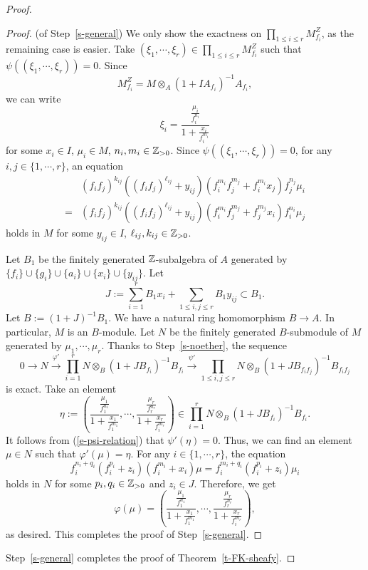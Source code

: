\begin{proof}
\begin{proof}(of Step~\ref{s-general}) 
We only show the exactness on $\prod_{1 \leq i\leq r} M_{f_i}^{Z}$, as the remaining case is easier. 
Take $(\xi_1, \cdots, \xi_r) \in \prod_{1 \leq i\leq r} M_{f_i}^{Z}$ 
such that $\psi((\xi_1, \cdots, \xi_r))=0$. 
Since 
$$M^Z_{f_i}=M \otimes_A (1+IA_{f_i})^{-1}A_{f_i},$$
we can write 
$$\xi_i=\frac{\frac{\mu_i}{f_i^{n_i}}}{1+\frac{x_i}{f_i^{m_i}}}$$
for some $x_i \in I$, $\mu_i \in M$, $n_i, m_i \in \mathbb{Z}_{>0}$. 
Since $\psi((\xi_1, \cdots, \xi_r))=0$, 
for any $i, j \in \{1, \cdots, r\}$, an equation  
\begin{equation}\label{e-psi-relation}
\begin{split}
\,\,\,\,&(f_if_j)^{k_{ij}}((f_if_j)^{\ell_{ij}}+y_{ij})(f_i^{m_i}f_j^{m_j}+f_i^{m_i}x_j)f_j^{n_j}\mu_i \\
=&(f_if_j)^{k_{ij}}((f_if_j)^{\ell_{ij}}+y_{ij})(f_i^{m_i}f_j^{m_j}+f_j^{m_j}x_i)f_i^{n_i}\mu_j
\end{split}
\end{equation}
holds in $M$ for some $y_{ij} \in I$, $\ell_{ij}, k_{ij} \in \mathbb{Z}_{>0}$. 



Let $B_1$ be the finitely generated $\mathbb{Z}$-subalgebra of $A$ generated by $\{f_i\} \cup \{g_i\} \cup \{a_i\} \cup \{x_i\} \cup \{y_{ij}\}$. 
Let 
$$J:=\sum_{i=1}^r B_1x_i+\sum_{1 \leq i, j \leq r} B_1y_{ij} \subset B_1.$$
Let $B:=(1+J)^{-1}B_1$. 
We have a natural ring homomorphism $B \to A$. 
In particular, $M$ is an $B$-module. 
Let $N$ be the finitely generated $B$-submodule of $M$ generated by $\mu_1, \cdots, \mu_r$. 
Thanks to Step~\ref{s-noether}, the sequence 
$$0 \to N \xrightarrow{\varphi'} \prod^r_{i=1} N \otimes_B (1+JB_{f_i})^{-1}B_{f_i}
\xrightarrow{\psi'} \prod_{1 \leq i, j \leq r} N \otimes_B (1+JB_{f_if_j})^{-1}B_{f_if_j}$$
is exact. 
Take an element 
$$\eta:=\left(\frac{\frac{\mu_1}{f_1^{n_1}}}{1+\frac{x_1}{f_1^{m_1}}}, \cdots, \frac{\frac{\mu_r}{f_r^{n_r}}}{1+\frac{x_r}{f_i^{m_r}}}\right) \in 
\prod^r_{i=1} N \otimes_B (1+JB_{f_i})^{-1}B_{f_i}.$$
It follows from (\ref{e-psi-relation}) that $\psi'(\eta)=0$. 
Thus, we can find an element $\mu \in N$ such that $\varphi'(\mu)=\eta$. 
For any $i \in \{1, \cdots, r\}$, the equation 
$$f_i^{n_i+q_i}(f_i^{p_i}+z_i)(f_i^{m_i}+x_i)\mu=f_i^{m_i+q_i}(f_i^{p_i}+z_i)\mu_i$$
holds in $N$ for some $p_i, q_i \in \mathbb{Z}_{>0}$ and $z_i \in J$. 
Therefore, we get 
$$\varphi(\mu)=\left(\frac{\frac{\mu_1}{f_1^{n_1}}}{1+\frac{x_1}{f_1^{m_1}}}, \cdots, \frac{\frac{\mu_r}{f_r^{n_r}}}{1+\frac{x_r}{f_i^{m_r}}}\right),$$
as desired. 
This completes the proof of Step~\ref{s-general}. 
\end{proof}
Step~\ref{s-general} completes the proof of Theorem~\ref{t-FK-sheafy}. 
\end{proof}

